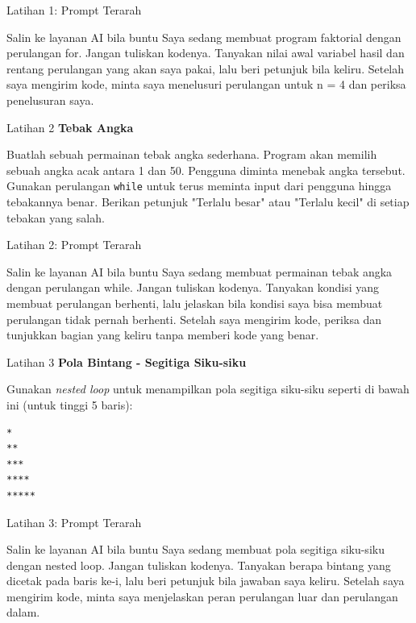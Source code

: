 \documentclass[aspectratio=169, table]{beamer}
\begin{document}
\begin{frame}{Latihan 1: Prompt Terarah}
\begin{block}{Salin ke layanan AI bila buntu}
\small Saya sedang membuat program faktorial dengan perulangan for. Jangan tuliskan kodenya. Tanyakan nilai awal variabel hasil dan rentang perulangan yang akan saya pakai, lalu beri petunjuk bila keliru. Setelah saya mengirim kode, minta saya menelusuri perulangan untuk n = 4 dan periksa penelusuran saya.
\end{block}
\end{frame}

\begin{frame}[fragile,allowframebreaks=0.8]{Latihan 2}
\footnotesize
\textbf{Tebak Angka}\par\medskip
Buatlah sebuah permainan tebak angka sederhana. Program akan memilih sebuah angka acak antara 1 dan 50. Pengguna diminta menebak angka tersebut. Gunakan perulangan \texttt{while} untuk terus meminta input dari pengguna hingga tebakannya benar. Berikan petunjuk "Terlalu besar" atau "Terlalu kecil" di setiap tebakan yang salah.
\end{frame}

\begin{frame}{Latihan 2: Prompt Terarah}
\begin{block}{Salin ke layanan AI bila buntu}
\small Saya sedang membuat permainan tebak angka dengan perulangan while. Jangan tuliskan kodenya. Tanyakan kondisi yang membuat perulangan berhenti, lalu jelaskan bila kondisi saya bisa membuat perulangan tidak pernah berhenti. Setelah saya mengirim kode, periksa dan tunjukkan bagian yang keliru tanpa memberi kode yang benar.
\end{block}
\end{frame}

\begin{frame}[fragile,allowframebreaks=0.8]{Latihan 3}
\footnotesize
\textbf{Pola Bintang - Segitiga Siku-siku}\par\medskip
Gunakan \textit{nested loop} untuk menampilkan pola segitiga siku-siku seperti di bawah ini (untuk tinggi 5 baris):
\begin{lstlisting}[language=bash, breaklines=true, basicstyle=\ttfamily\scriptsize]
*
**
***
****
*****
\end{lstlisting}
\end{frame}

\begin{frame}{Latihan 3: Prompt Terarah}
\begin{block}{Salin ke layanan AI bila buntu}
\small Saya sedang membuat pola segitiga siku-siku dengan nested loop. Jangan tuliskan kodenya. Tanyakan berapa bintang yang dicetak pada baris ke-i, lalu beri petunjuk bila jawaban saya keliru. Setelah saya mengirim kode, minta saya menjelaskan peran perulangan luar dan perulangan dalam.
\end{block}
\end{frame}
\end{document}
